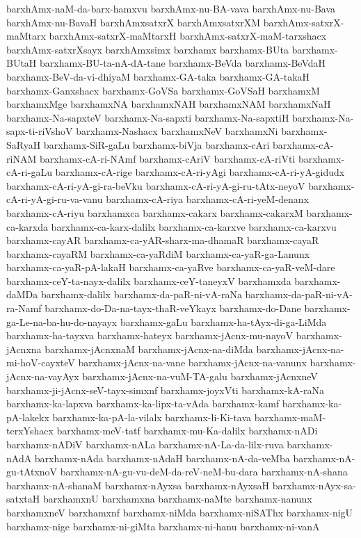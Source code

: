 {barxhAmx-naM-da-barx-hamxvu
barxhAmx-nu-BA-vava
barxhAmx-nu-Bava
barxhAmx-nu-BavaH
barxhAmxsatxrX
barxhAmxsatxrXM
barxhAmx-satxrX-maMtarx
barxhAmx-satxrX-maMtarxH
barxhAmx-satxrX-maM-tarxshacx
barxhAmx-satxrXsayx
barxhAmxsimx
barxhamx
barxhamx-BUta
barxhamx-BUtaH
barxhamx-BU-ta-nA-dA-tane
barxhamx-BeVda
barxhamx-BeVdaH
barxhamx-BeV-da-vi-dhiyaM
barxhamx-GA-taka
barxhamx-GA-takaH
barxhamx-Ganxshacx
barxhamx-GoVSa
barxhamx-GoVSaH
barxhamxM
barxhamxMge
barxhamxNA
barxhamxNAH
barxhamxNAM
barxhamxNaH
barxhamx-Na-sapxteV
barxhamx-Na-sapxti
barxhamx-Na-sapxtiH
barxhamx-Na-sapx-ti-riVshoV
barxhamx-Nashacx
barxhamxNeV
barxhamxNi
barxhamx-SaRyaH
barxhamx-SiR-gaLu
barxhamx-biVja
barxhamx-cAri
barxhamx-cA-riNAM
barxhamx-cA-ri-NAmf
barxhamx-cAriV
barxhamx-cA-riVti
barxhamx-cA-ri-gaLu
barxhamx-cA-rige
barxhamx-cA-ri-yAgi
barxhamx-cA-ri-yA-gidudx
barxhamx-cA-ri-yA-gi-ra-beVku
barxhamx-cA-ri-yA-gi-ru-tAtx-neyoV
barxhamx-cA-ri-yA-gi-ru-va-vanu
barxhamx-cA-riya
barxhamx-cA-ri-yeM-denanx
barxhamx-cA-riyu
barxhamxca
barxhamx-cakarx
barxhamx-cakarxM
barxhamx-ca-karxda
barxhamx-ca-karx-dalilx
barxhamx-ca-karxve
barxhamx-ca-karxvu
barxhamx-cayAR
barxhamx-ca-yAR-sharx-ma-dhamaR
barxhamx-cayaR
barxhamx-cayaRM
barxhamx-ca-yaRdiM
barxhamx-ca-yaR-ga-Lanunx
barxhamx-ca-yaR-pA-lakaH
barxhamx-ca-yaRve
barxhamx-ca-yaR-veM-dare
barxhamx-ceY-ta-nayx-dalilx
barxhamx-ceY-taneyxV
barxhamxda
barxhamx-daMDa
barxhamx-dalilx
barxhamx-da-paR-ni-vA-raNa
barxhamx-da-paR-ni-vA-ra-Namf
barxhamx-do-Da-na-tayx-thaR-veYkayx
barxhamx-do-Dane
barxhamx-ga-Le-na-ba-hu-do-nayayx
barxhamx-gaLu
barxhamx-ha-tAyx-di-ga-LiMda
barxhamx-ha-tayxva
barxhamx-hateyx
barxhamx-jAcnx-mu-nayoV
barxhamx-jAcnxna
barxhamx-jAcnxnaM
barxhamx-jAcnx-na-diMda
barxhamx-jAcnx-na-mi-hoV-cayxteV
barxhamx-jAcnx-na-vane
barxhamx-jAcnx-na-vanunx
barxhamx-jAcnx-na-vayAyx
barxhamx-jAcnx-na-vuM-TA-galu
barxhamx-jAcnxneV
barxhamx-ji-jAcnx-seV-tayx-simxnf
barxhamx-joyxVti
barxhamx-kA-raNa
barxhamx-ka-lapxva
barxhamx-ka-lipx-ta-vAda
barxhamx-kamf
barxhamx-ka-pA-lakekx
barxhamx-ka-pA-la-vilalx
barxhamx-li-Ki-tava
barxhamx-maM-terxYshacx
barxhamx-meV-tatf
barxhamx-mu-Ka-dalilx
barxhamx-nADi
barxhamx-nADiV
barxhamx-nALa
barxhamx-nA-La-da-lilx-ruva
barxhamx-nAdA
barxhamx-nAda
barxhamx-nAdaH
barxhamx-nA-da-veMba
barxhamx-nA-gu-tAtxnoV
barxhamx-nA-gu-vu-deM-da-reV-neM-bu-dara
barxhamx-nA-shana
barxhamx-nA-shanaM
barxhamx-nAyxsa
barxhamx-nAyxsaH
barxhamx-nAyx-sa-satxtaH
barxhamxnU
barxhamxna
barxhamx-naMte
barxhamx-nanunx
barxhamxneV
barxhamxnf
barxhamx-niMda
barxhamx-niSAThx
barxhamx-nigU
barxhamx-nige
barxhamx-ni-giMta
barxhamx-ni-hanu
barxhamx-ni-vanA
}
